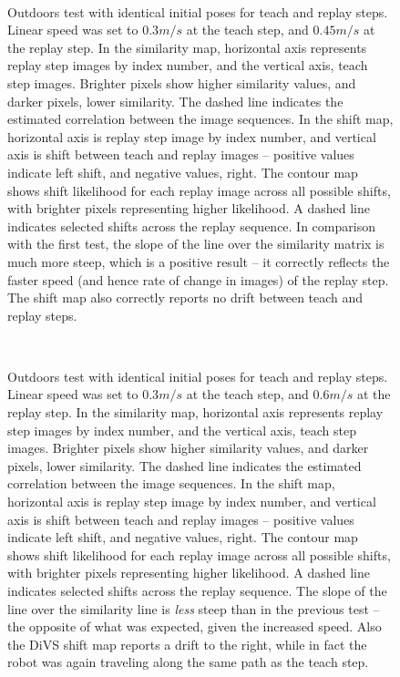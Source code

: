 \documentclass[twocolumn, 9pt,fleqn]{jsproceedings}
\begin{document}
\begin{figure}[t]
\\
\caption{Outdoors test with identical initial poses for teach and replay steps. Linear speed was set to $0.3m/s$ at the teach step, and $0.45m/s$ at the replay step. In the similarity map, horizontal axis represents replay step images by index number, and the vertical axis, teach step images. Brighter pixels show higher similarity values, and darker pixels, lower similarity. The dashed line indicates the estimated correlation between the image sequences. In the shift map, horizontal axis is replay step image by index number, and vertical axis is shift between teach and replay images -- positive values indicate left shift, and negative values, right. The contour map shows shift likelihood for each replay image across all possible shifts, with brighter pixels representing higher likelihood. A dashed line indicates selected shifts across the replay sequence. In comparison with the first test, the slope of the line over the similarity matrix is much more steep, which is a positive result -- it correctly reflects the faster speed (and hence rate of change in images) of the replay step. The shift map also correctly reports no drift between teach and replay steps.}
\label{fig:outdoors_45}
\end{figure}

\begin{figure}[t]
\\
\caption{Outdoors test with identical initial poses for teach and replay steps. Linear speed was set to $0.3m/s$ at the teach step, and $0.6m/s$ at the replay step. In the similarity map, horizontal axis represents replay step images by index number, and the vertical axis, teach step images. Brighter pixels show higher similarity values, and darker pixels, lower similarity. The dashed line indicates the estimated correlation between the image sequences. In the shift map, horizontal axis is replay step image by index number, and vertical axis is shift between teach and replay images -- positive values indicate left shift, and negative values, right. The contour map shows shift likelihood for each replay image across all possible shifts, with brighter pixels representing higher likelihood. A dashed line indicates selected shifts across the replay sequence. The slope of the line over the similarity line is \textit{less} steep than in the previous test -- the opposite of what was expected, given the increased speed. Also the DiVS shift map reports a drift to the right, while in fact the robot was again traveling along the same path as the teach step.}
\label{fig:outdoors_60}
\end{figure}
\end{document}
